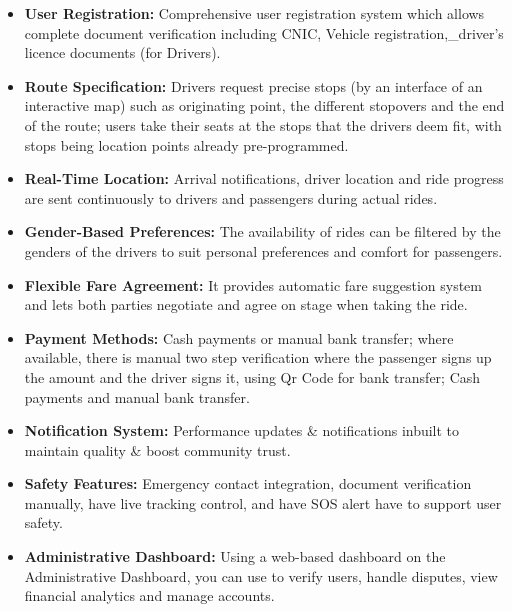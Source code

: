 \begin{itemize}
    \item \textbf{User Registration:} Comprehensive user registration system which allows complete document verification including CNIC, Vehicle registration,_driver's licence documents (for Drivers).

    \item \textbf{Route Specification:} Drivers request precise stops (by an interface of an interactive map) such as originating point, the different stopovers and the end of the route; users take their seats at the stops that the drivers deem fit, with stops being location points already pre-programmed.

    \item \textbf{Real-Time Location:} Arrival notifications, driver location and ride progress are sent continuously to drivers and passengers during actual rides.

    \item \textbf{Gender-Based Preferences:} The availability of rides can be filtered by the genders of the drivers to suit personal preferences and comfort for passengers.

    \item \textbf{Flexible Fare Agreement:} It provides automatic fare suggestion system and lets both parties negotiate and agree on stage when taking the ride.

    \item \textbf{Payment Methods:} Cash payments or manual bank transfer; where available, there is manual two step verification where the passenger signs up the amount and the driver signs it, using Qr Code for bank transfer; Cash payments and manual bank transfer.

    \item \textbf{Notification System:} Performance updates \& notifications inbuilt to maintain quality \& boost community trust.

    \item \textbf{Safety Features:} Emergency contact integration, document verification manually, have live tracking control, and have SOS alert have to support user safety.

    \item \textbf{Administrative Dashboard:} Using a web-based dashboard on the Administrative Dashboard, you can use to verify users, handle disputes, view financial analytics and manage accounts.
\end{itemize}

